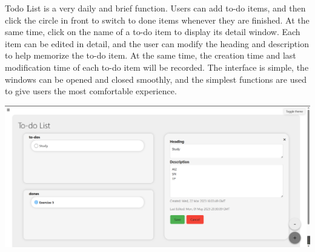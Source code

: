 \documentclass[a4paper]{article}
\begin{document}
Todo List is a very daily and brief function. Users can add to-do items, and then click the circle in front to switch to done items whenever they are finished. At the same time, click on the name of a to-do item to display its detail window. Each item can be edited in detail, and the user can modify the heading and description to help memorize the to-do item. At the same time, the creation time and last modification time of each to-do item will be recorded. The interface is simple, the windows can be opened and closed smoothly, and the simplest functions are used to give users the most comfortable experience.

{\noindent\includegraphics[width=\linewidth]{./image/Todo_list_light.png}}
\end{document}
